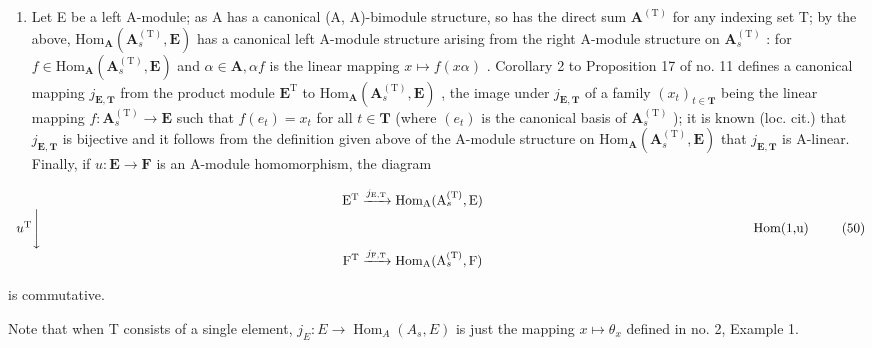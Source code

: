 \begin{enumerate}
\def\labelenumi{(\arabic{enumi})}
\setcounter{enumi}{1}
\tightlist
\item
  Let E be a left A-module; as A has a canonical (A, A)-bimodule structure, so has the direct sum \(\mathbf{A}^{(\mathrm{T})}\) for any indexing set T; by the above, \(\mathrm{Hom}_{\mathbf{A}}(\mathbf{A}_{s}^{\mathrm{(T)}},\mathbf{E})\) has a canonical left A-module structure arising from the right A-module structure on \(\mathbf{A}_{s}^{\mathrm{(T)}}\) : for \(f\in\mathrm{Hom}_{\mathbf{A}}(\mathbf{A}_{s}^{\mathrm{(T)}},\mathbf{E})\) and \(\alpha\in\mathbf{A},\alpha f\) is the linear mapping \(x\mapsto f(x\alpha)\) . Corollary 2 to Proposition 17 of no. 11 defines a canonical mapping \(j_{\mathbf{E},\mathbf{T}}\) from the product module \(\mathbf{E}^{\mathrm{T}}\) to \(\mathrm{Hom}_{\mathbf{A}}(\mathbf{A}_{s}^{\mathrm{(T)}},\mathbf{E})\) , the image under \(j_{\mathbf{E},\mathbf{T}}\) of a family \((x_{t})_{t\in\mathbf{T}}\) being the linear mapping \(f:\mathbf{A}_{s}^{\mathrm{(T)}}\to\mathbf{E}\) such that \(f(e_{t})=x_{t}\) for all \(t\in\mathbf{T}\) (where \((e_{t})\) is the canonical basis of \(\mathbf{A}_{s}^{\mathrm{(T)}}\) ); it is known (loc. cit.) that \(j_{\mathbf{E},\mathbf{T}}\) is bijective and it follows from the definition given above of the A-module structure on \(\mathrm{Hom}_{\mathbf{A}}(\mathbf{A}_{s}^{\mathrm{(T)}},\mathbf{E})\) that \(j_{\mathbf{E},\mathbf{T}}\) is A-linear. Finally, if \(u:\mathbf{E}\to\mathbf{F}\) is an A-module homomorphism, the diagram
\end{enumerate}

\[
\begin{array}{c} \mathrm {E^ {T}} \xrightarrow {j _ {\mathrm{E,T}}} \operatorname{Hom} _ {\mathrm{A}} (\mathrm{A} _ {s} ^ {(\mathrm{T})}, \mathrm{E}) \\ u ^ {\mathrm{T}} \Biggl \downarrow \qquad \qquad \qquad \qquad \qquad \qquad \qquad \qquad \qquad \qquad \qquad \qquad \qquad \qquad \qquad \qquad \qquad \qquad \qquad \qquad \qquad \qquad \qquad \qquad \qquad \qquad \qquad \text {Hom(1,u)} \\ \mathrm {F^ {T}} \xrightarrow {j _ {\mathrm{F,T}}} \operatorname{Hom} _ {\mathrm{A}} (\mathrm{A} _ {s} ^ {(\mathrm{T})}, \mathrm{F}) \end{array}\tag{50}
\]

is commutative.

Note that when T consists of a single element, \(j_{E}:E \to \operatorname{Hom}_{A}(A_{s}, E)\) is just the mapping \(x \mapsto \theta_{x}\) defined in no. 2, Example 1.

